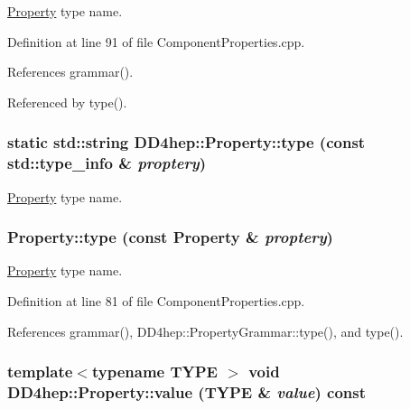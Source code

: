 \hyperlink{class_d_d4hep_1_1_property}{Property} type name. 

Definition at line 91 of file ComponentProperties.cpp.

References grammar().

Referenced by type().\hypertarget{class_d_d4hep_1_1_property_aeeb502311c3a963033cd82c82e2874d9}{
\subsubsection[{type}]{\setlength{\rightskip}{0pt plus 5cm}static std::string DD4hep::Property::type (const std::type\_\-info \& {\em proptery})}}
\label{class_d_d4hep_1_1_property_aeeb502311c3a963033cd82c82e2874d9}


\hyperlink{class_d_d4hep_1_1_property}{Property} type name. \hypertarget{class_d_d4hep_1_1_property_a77de012a4b602cc74b395050128d289c}{
\subsubsection[{type}]{ Property::type (const {\bf Property} \& {\em proptery})}}
\label{class_d_d4hep_1_1_property_a77de012a4b602cc74b395050128d289c}


\hyperlink{class_d_d4hep_1_1_property}{Property} type name. 

Definition at line 81 of file ComponentProperties.cpp.

References grammar(), DD4hep::PropertyGrammar::type(), and type().\hypertarget{class_d_d4hep_1_1_property_a0ad39ca9d70318555ad137780185e92d}{
\subsubsection[{value}]{\setlength{\rightskip}{0pt plus 5cm}template$<$typename TYPE $>$ void DD4hep::Property::value (TYPE \& {\em value}) const}}
\label{class_d_d4hep_1_1_property_a0ad39ca9d70318555ad137780185e92d}


